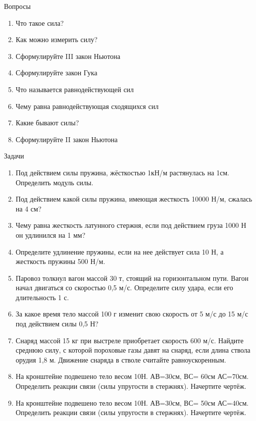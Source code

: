\documentclass[a5paper, 10pt]{diss_4}
\renewcommand{\'}{\,'}
\begin{document}
\begin{center}
   Вопросы
\end{center}
\begin{enumerate}
\item Что такое сила?
\item Как можно измерить силу?
\item Сформулируйте III закон Ньютона
\item Сформулируйте закон Гука
\item Что называется равнодействующей сил
\item Чему равна равнодействующая сходящихся сил
\item Какие бывают силы?
\item Сформулируйте II закон Ньютона
\end{enumerate}

\begin{center}
   Задачи
\end{center}
\begin{enumerate}
\item Под действием силы пружина, жёсткостью 1кН/м растянулась на 1см. Определить модуль силы.
\item Под действием какой силы пружина, имеющая жесткость 10000 Н/м, сжалась на 4 см?
\item Чему равна жесткость латунного стержня, если под действием груза 1000 Н он удлинился на 1 мм?
\item Определите удлинение пружины, если на нее действует сила 10 Н, а жесткость пружины 500 Н/м.
\item Паровоз толкнул вагон массой 30 т, стоящий на горизонтальном пути. Вагон начал двигаться со скоростью 0,5 м/с. Определите силу удара, если его длительность 1 с.
\item За какое время тело массой 100 г изменит свою скорость от 5 м/с до 15 м/с под действием силы 0,5 Н?
\item Снаряд массой 15 кг при выстреле приобретает скорость 600 м/с. Найдите среднюю силу, с которой пороховые газы давят на снаряд, если длина ствола орудия 1,8 м. Движение снаряда в стволе считайте равноускоренным.
\item На кронштейне подвешено тело весом 10Н. АВ=30см, ВС= 60см АС=70см. Определить реакции связи (силы упругости в стержнях). Начертите чертёж.
\item На кронштейне подвешено тело весом 10Н. АВ=30см, ВС= 50см АС=40см. Определить реакции связи (силы упругости в стержнях). Начертите чертёж.
\end{enumerate}
\end{document}
